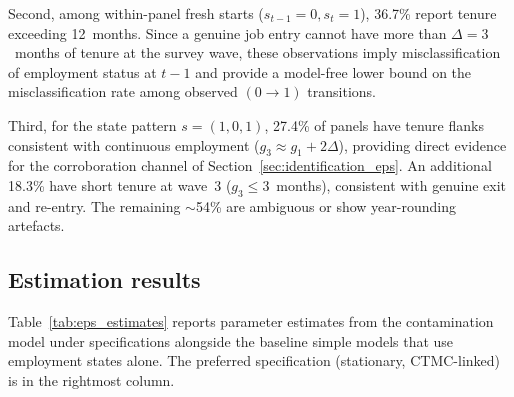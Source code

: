 \documentclass[12pt]{article}
\begin{document}
Second, among within-panel fresh starts ($s_{t-1}=0, s_t=1$), 36.7\%
report tenure exceeding 12~months. Since a genuine job entry cannot have
more than $\Delta = 3$~months of tenure at the survey wave, these
observations imply misclassification of employment status at $t{-}1$ and
provide a model-free lower bound on the misclassification rate among
observed $(0 \to 1)$ transitions.

Third, for the state pattern $s = (1,0,1)$, 27.4\% of panels have tenure
flanks consistent with continuous employment ($g_3 \approx g_1 + 2\Delta$),
providing direct evidence for the corroboration channel of
Section~\ref{sec:identification_eps}. An additional 18.3\% have short
tenure at wave~3 ($g_3 \le 3$~months), consistent with genuine exit and
re-entry. The remaining $\sim$54\% are ambiguous or show year-rounding
artefacts.

\subsection{Estimation results}

Table~\ref{tab:eps_estimates} reports parameter estimates from the
contamination model under specifications alongside the
baseline simple models that use employment states alone. The preferred
specification (stationary, CTMC-linked) is in the rightmost column.
\end{document}
